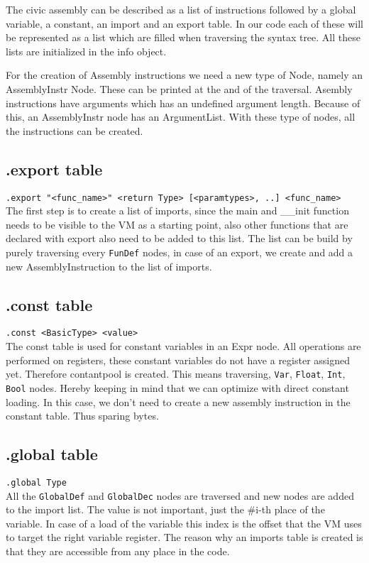 \documentclass[a4paper]{article}
\begin{document}
The civic assembly can be described as a list of instructions followed by
a global variable, a constant, an import and an export table. In our code each
of these will be represented as a list which are filled when traversing the
syntax tree. All these lists are initialized in the info object.

For the creation of Assembly instructions we need a new type of Node, namely an
AssemblyInstr Node. These can be printed at the and of the traversal.
Asembly instructions have arguments which has an undefined argument length.
Because of this, an AssemblyInstr node has an ArgumentList. With these type of
nodes, all the instructions can be created.

\subsection{.export table}
\texttt{.export "<func\_name>" <return Type> [<paramtypes>, ..] <func\_name>} \\
The first step is to create a list of imports, since the main and \_\_init function
needs to be visible to the VM as a starting point, also other functions that are
declared with export also need to be added to this list. The list can be build
by purely traversing every \texttt{FunDef} nodes, in case of an export, we
create and add a new AssemblyInstruction to the list of imports.

\subsection{.const table}
\texttt{.const <BasicType> <value>} \\
The const table is used for constant variables in an Expr node. All operations
are performed on registers, these constant variables do not have a register
assigned yet. Therefore contantpool is created. This means traversing,
\texttt{Var}, \texttt{Float}, \texttt{Int}, \texttt{Bool} nodes. Hereby keeping
in mind that we can optimize with direct constant loading. In this case, we
don't need to create a new assembly instruction in the constant table. Thus
sparing bytes.

\subsection{.global table}
\texttt{.global Type}\\
All the \texttt{GlobalDef} and \texttt{GlobalDec} nodes are traversed and new
nodes are added to the import list. The value is not important, just the \#i-th
place of the variable. In case of a load of the variable this index is the
offset that the VM uses to target the right variable register. The reason why
an imports table is created is that they are accessible from any place in the
code.
\end{document}
